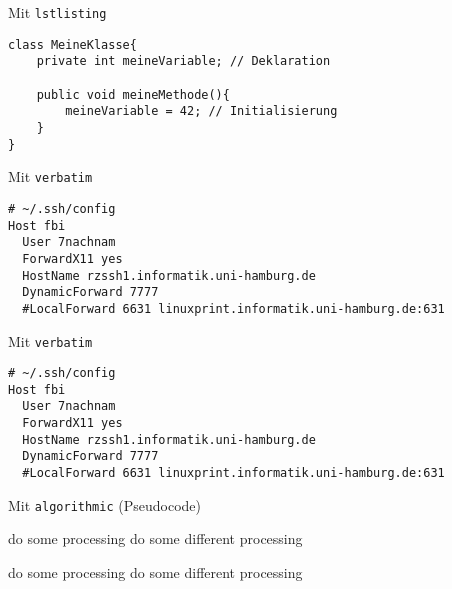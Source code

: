\documentclass{beamer}
\begin{document}

		\begin{frame}[containsverbatim]{Mit \texttt{lstlisting}}
			\begin{lstlisting}[caption=Variablen]
class MeineKlasse{
	private int meineVariable; // Deklaration

	public void meineMethode(){
		meineVariable = 42; // Initialisierung
	}
}
			\end{lstlisting}
		\end{frame}

		
		\begin{frame}[containsverbatim]{Mit \texttt{verbatim}}
			\begin{smallerlatexcode}
\begin{verbatim}
# ~/.ssh/config
Host fbi
  User 7nachnam
  ForwardX11 yes
  HostName rzssh1.informatik.uni-hamburg.de
  DynamicForward 7777
  #LocalForward 6631 linuxprint.informatik.uni-hamburg.de:631
\end{verbatim}
			\end{smallerlatexcode}
		\end{frame}


		\begin{frame}[containsverbatim]{Mit \texttt{verbatim}}
{
\small
			\begin{verbatim}
# ~/.ssh/config
Host fbi
  User 7nachnam
  ForwardX11 yes
  HostName rzssh1.informatik.uni-hamburg.de
  DynamicForward 7777
  #LocalForward 6631 linuxprint.informatik.uni-hamburg.de:631			
			\end{verbatim}
}

		\end{frame}		

		
		\begin{frame}[containsverbatim]{Mit \texttt{algorithmic} (Pseudocode)}
			\begin{smalllatexcode}
\begin{algorithmic}
        \STATE do some processing
        \STATE do some different processing
    \ENDIF
\end{algorithmic}
			\end{smalllatexcode}

\begin{algorithmic}
        \STATE do some processing
        \STATE do some different processing
    \ENDIF
\end{algorithmic}

		\end{frame}
\end{document}
